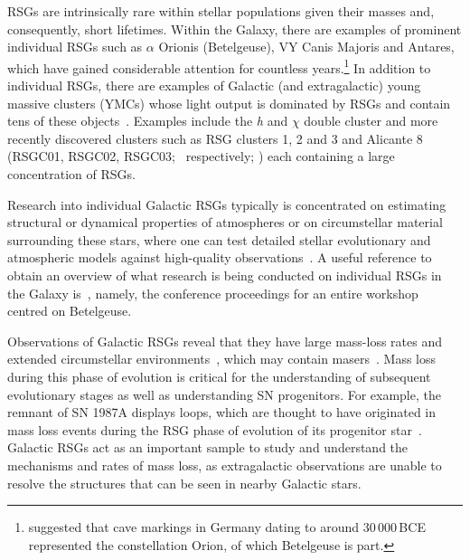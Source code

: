 RSGs are intrinsically rare within stellar populations given their masses and, consequently, short lifetimes.
Within the Galaxy, there are examples of prominent individual RSGs such as $\alpha$ Orionis (Betelgeuse), VY Canis Majoris and Antares, which have gained considerable attention for countless years.\footnote{\cite{2003UppOR..59...51R} suggested that cave markings in Germany dating to around 30\,000\,BCE represented the constellation Orion, of which Betelgeuse is part.}
In addition to individual RSGs, there are examples of Galactic (and extragalactic) young massive clusters (YMCs) whose light output is dominated by RSGs and contain tens of these objects~\citep{2014ApJ...788...58G}.
Examples include the {\it h} and $\chi$ double cluster and more recently discovered clusters such as RSG clusters 1, 2 and 3 and Alicante 8 (RSGC01, RSGC02, RSGC03;~\citealp{2006ApJ...643.1166F,2007ApJ...671..781D,2009A&A...498..109C} respectively; \citealp{2010A&A...513A..74N}) each containing a large concentration of RSGs.

Research into individual Galactic RSGs typically is concentrated on estimating structural or dynamical properties of atmospheres or on circumstellar material surrounding these stars, where one can test detailed stellar evolutionary and atmospheric models against high-quality observations~\citep[e.g.][]{2014A&A...561A..15C}.
A useful reference to obtain an overview of what research is being conducted on individual RSGs in the Galaxy is~\cite{2013EAS....60.....K}, namely, the conference proceedings for an entire workshop centred on Betelgeuse.

Observations of Galactic RSGs reveal that they have large mass-loss rates
\citep[10$^{-(6\pm 1)}$\,M$_{\odot}$\,yr$^{-1}$;][]{Danchi94, Richards13,2016AJ....151...51S} and extended circumstellar environments~\citep{Smith01,2014MNRAS.437L...1W}, which may contain masers~\citep[e.g.][]{Schuster06,2012ApJ...744...23Z}.
Mass loss during this phase of evolution is critical for the understanding of subsequent evolutionary stages as well as understanding SN progenitors.
For example, the remnant of SN 1987A displays loops, which are thought to have originated in mass loss events during the RSG phase of evolution of its progenitor star~\citep[][and references therein]{Humphreys13}.
Galactic RSGs act as an important sample to study and understand the mechanisms and rates of mass loss, as extragalactic observations are unable to resolve the structures that can be seen in nearby Galactic stars.

